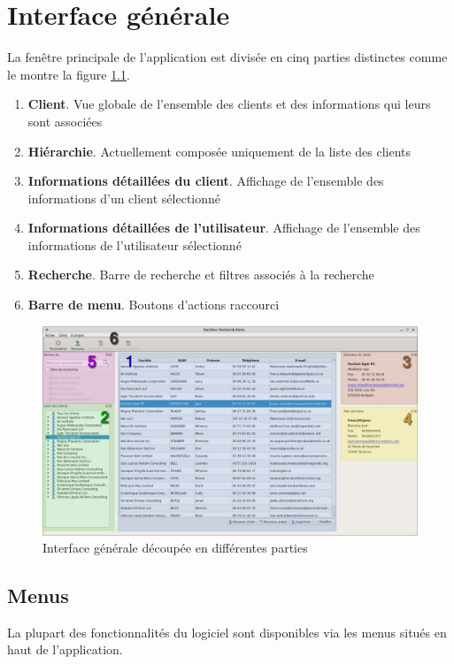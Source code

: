 \chapter{Interface générale}
La fenêtre principale de l'application est divisée en cinq parties distinctes comme le montre la figure \ref{fig:ihm}. 

\begin{enumerate}
	\item \textbf{Client}. Vue globale de l'ensemble des clients et des informations qui leurs sont associées	
	\item \textbf{Hiérarchie}. Actuellement composée uniquement de la liste des clients
	\item \textbf{Informations détaillées du client}. Affichage de l'ensemble des informations d’un client sélectionné
	\item \textbf{Informations détaillées de l'utilisateur}. Affichage de l'ensemble des informations de l'utilisateur sélectionné 
	\item \textbf{Recherche}. Barre de recherche et filtres associés à la recherche
	\item \textbf{Barre de menu}. Boutons d’actions raccourci
\end{enumerate}

\begin{figure}[H]
	\centering
	\includegraphics[width=15cm]{screens/ihm.jpg}
	\caption{Interface générale découpée en différentes parties}
	\label{fig:ihm}
\end{figure}

\section{Menus}
La plupart des fonctionnalités du logiciel sont disponibles via les menus situés en haut de l’application. 


